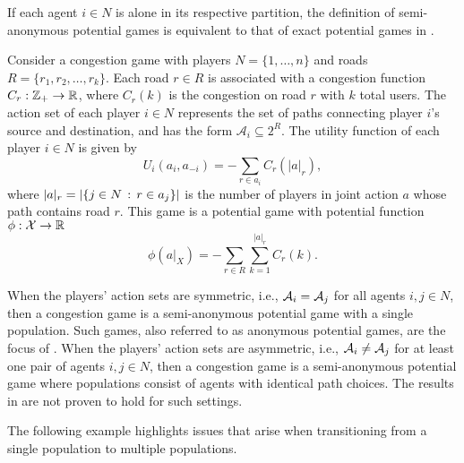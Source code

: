 \smallskip

\noindent If each agent $i \in N$ is alone in its respective partition, the definition of semi-anonymous potential games is equivalent to that of exact potential games in \cite{Monderer1996}.

\begin{example}
%
Consider a congestion game with players $N = \{1,\ldots,n\}$ and roads $R = \{r_1,r_2,\ldots,r_k\}$. Each road $r\in R$ is associated with a congestion function $C_{r}:\mathbb{Z}_+\to \mathbb{R}$, where $C_r(k)$ is the congestion on road $r$ with $k$ total users.
The action set of each player $i \in N$ represents the set of paths connecting player $i$'s source and destination, and has the form $\mathcal{A}_i\subseteq 2^R$.  The utility function of each player $i \in N$ is given by
%
$$U_i(a_i,a_{-i}) = -\sum_{r\in a_i} C_r(|a|_r),$$
%
where $|a|_r = |\{j\in N\,:\, r\in a_j\}|$ is the number of players in joint action $a$ whose path contains road $r$.  This game is a potential game with potential function $\phi:\mathcal{X}\to \mathbb{R}$
\begin{equation}
\phi(a|_X) = -\sum_{r\in R}\sum_{k=1}^{|a|_r}C_r(k).
\end{equation}

When the players' action sets are symmetric, i.e., ${\cal A}_i = {\cal A}_j$ for all agents $i,j \in N$, then a congestion game is a semi-anonymous potential game with a single population.  Such games, also referred to as anonymous potential games, are the focus of \cite{Shah2010}.  When the players' action sets are asymmetric, i.e., ${\cal A}_i \neq {\cal A}_j$ for at least one pair of agents $i,j \in N$, then a congestion game is a semi-anonymous potential game where populations consist of agents with identical path choices.  The results in \cite{Shah2010} are not proven to hold for such settings.  
%
\end{example}

The following example highlights issues that arise when transitioning from a single population to multiple populations.  

